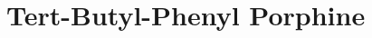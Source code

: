 \documentclass[
10pt,					%
a4paper,				%
twoside,				%
BCOR=8mm,				%
headings=normal,		%
headsepline,			%
footsepline,			%
plainfootsepline,		%
]{scrbook}
\begin{document}
%
%  
%  	
%     
%     
%     
%     
\chapter{Tert-Butyl-Phenyl Porphine}
    
\end{document}
